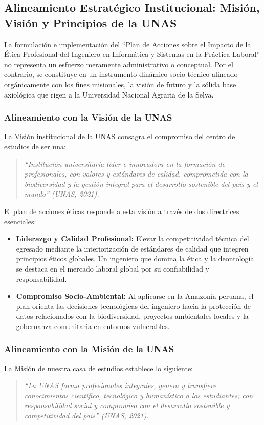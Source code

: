 \documentclass[12pt,a4paper]{article}
\begin{document}
\subsection{Alineamiento Estratégico Institucional: Misión, Visión y Principios de la UNAS}
La formulación e implementación del ``Plan de Acciones sobre el Impacto de la Ética Profesional del Ingeniero en Informática y Sistemas en la Práctica Laboral'' no representa un esfuerzo meramente administrativo o conceptual. Por el contrario, se constituye en un instrumento dinámico socio-técnico alineado orgánicamente con los fines misionales, la visión de futuro y la sólida base axiológica que rigen a la Universidad Nacional Agraria de la Selva.

\subsubsection{Alineamiento con la Visión de la UNAS}
La Visión institucional de la UNAS consagra el compromiso del centro de estudios de ser una:
\begin{quote}
    \textit{“Institución universitaria líder e innovadora en la formación de profesionales, con valores y estándares de calidad, comprometida con la biodiversidad y la gestión integral para el desarrollo sostenible del país y el mundo” (UNAS, 2021).}
\end{quote}

El plan de acciones éticas responde a esta visión a través de dos directrices esenciales:
\begin{itemize}
    \item \textbf{Liderazgo y Calidad Profesional:} Elevar la competitividad técnica del egresado mediante la interiorización de estándares de calidad que integren principios éticos globales. Un ingeniero que domina la ética y la deontología se destaca en el mercado laboral global por su confiabilidad y responsabilidad.
    \item \textbf{Compromiso Socio-Ambiental:} Al aplicarse en la Amazonía peruana, el plan orienta las decisiones tecnológicas del ingeniero hacia la protección de datos relacionados con la biodiversidad, proyectos ambientales locales y la gobernanza comunitaria en entornos vulnerables.
\end{itemize}

\subsubsection{Alineamiento con la Misión de la UNAS}
La Misión de nuestra casa de estudios establece lo siguiente:
\begin{quote}
    \textit{“La UNAS forma profesionales integrales, genera y transfiere conocimientos científico, tecnológico y humanístico a los estudiantes; con responsabilidad social y compromiso con el desarrollo sostenible y competitividad del país” (UNAS, 2021).}
\end{quote}
\end{document}
